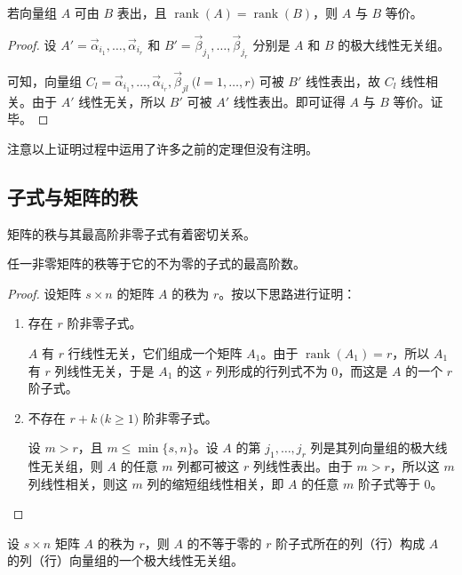 \begin{theorem}
	若向量组 $A$ 可由 $B$ 表出，且 $\operatorname{rank}(A) = \operatorname{rank}(B)$，则 $A$ 与 $B$ 等价。
\end{theorem}

\begin{proof}
	设 $A' = \vec \alpha_{i_1}, \ldots, \vec \alpha_{i_r}$ 和 $B' = \vec \beta_{j_1}, \ldots, \vec \beta_{j_r}$ 分别是 $A$ 和 $B$ 的极大线性无关组。

	可知，向量组 $C_l = \vec \alpha_{i_1}, \ldots, \vec \alpha_{i_r}, \vec \beta_{jl} \pod{l = 1, \ldots, r}$ 可被 $B'$ 线性表出，故 $C_l$ 线性相关。由于 $A'$ 线性无关，所以 $B'$ 可被 $A'$ 线性表出。即可证得 $A$ 与 $B$ 等价。证毕。
\end{proof}

注意以上证明过程中运用了许多之前的定理但没有注明。

\subsection{子式与矩阵的秩}

矩阵的秩与其最高阶非零子式有着密切关系。

\begin{theorem}
	任一非零矩阵的秩等于它的不为零的子式的最高阶数。
\end{theorem}

\begin{proof}
	设矩阵 $s \times n$ 的矩阵 $A$ 的秩为 $r$。按以下思路进行证明：
	\begin{enumerate}
		\item 存在 $r$ 阶非零子式。

		$A$ 有 $r$ 行线性无关，它们组成一个矩阵 $A_1$。由于 $\operatorname{rank}(A_1) = r$，所以 $A_1$ 有 $r$ 列线性无关，于是 $A_1$ 的这 $r$ 列形成的行列式不为 $0$，而这是 $A$ 的一个 $r$ 阶子式。

		\item 不存在 $r + k \pod{k \ge 1}$ 阶非零子式。

		设 $m > r$，且 $m \le \min\{s, n\}$。设 $A$ 的第 $j_1, \ldots, j_r$ 列是其列向量组的极大线性无关组，则 $A$ 的任意 $m$ 列都可被这 $r$ 列线性表出。由于 $m > r$，所以这 $m$ 列线性相关，则这 $m$ 列的缩短组线性相关，即 $A$ 的任意 $m$ 阶子式等于 $0$。
	\end{enumerate}
\end{proof}


\begin{theorem}
	设 $s \times n$ 矩阵 $A$ 的秩为 $r$，则 $A$ 的不等于零的 $r$ 阶子式所在的列（行）构成 $A$ 的列（行）向量组的一个极大线性无关组。
\end{theorem}

